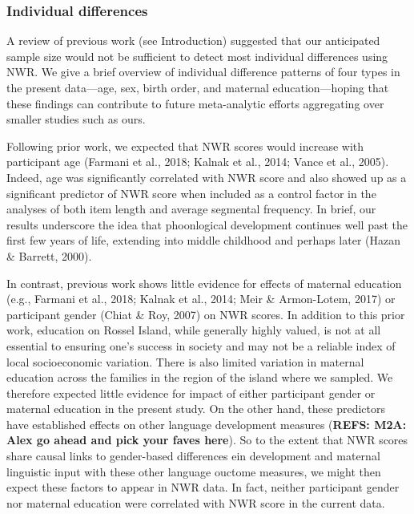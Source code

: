 \documentclass[english,,man,floatsintext]{apa6}
\begin{document}
\subsubsection{Individual differences}\label{individual-differences}

A review of previous work (see Introduction) suggested that our
anticipated sample size would not be sufficient to detect most
individual differences using NWR. We give a brief overview of individual
difference patterns of four types in the present data---age, sex, birth
order, and maternal education---hoping that these findings can
contribute to future meta-analytic efforts aggregating over smaller
studies such as ours.

Following prior work, we expected that NWR scores would increase with
participant age (Farmani et al., 2018; Kalnak et al., 2014; Vance et
al., 2005). Indeed, age was significantly correlated with NWR score and
also showed up as a significant predictor of NWR score when included as
a control factor in the analyses of both item length and average
segmental frequency. In brief, our results underscore the idea that
phoonlogical development continues well past the first few years of
life, extending into middle childhood and perhaps later (Hazan \&
Barrett, 2000).

In contrast, previous work shows little evidence for effects of maternal
education (e.g., Farmani et al., 2018; Kalnak et al., 2014; Meir \&
Armon-Lotem, 2017) or participant gender (Chiat \& Roy, 2007) on NWR
scores. In addition to this prior work, education on Rossel Island,
while generally highly valued, is not at all essential to ensuring one's
success in society and may not be a reliable index of local
socioeconomic variation. There is also limited variation in maternal
education across the families in the region of the island where we
sampled. We therefore expected little evidence for impact of either
participant gender or maternal education in the present study. On the
other hand, these predictors have established effects on other language
development measures (\textbf{REFS: M2A: Alex go ahead and pick your
faves here}). So to the extent that NWR scores share causal links to
gender-based differences ein development and maternal linguistic input
with these other language ouctome measures, we might then expect these
factors to appear in NWR data. In fact, neither participant gender nor
maternal education were correlated with NWR score in the current data.
\end{document}
